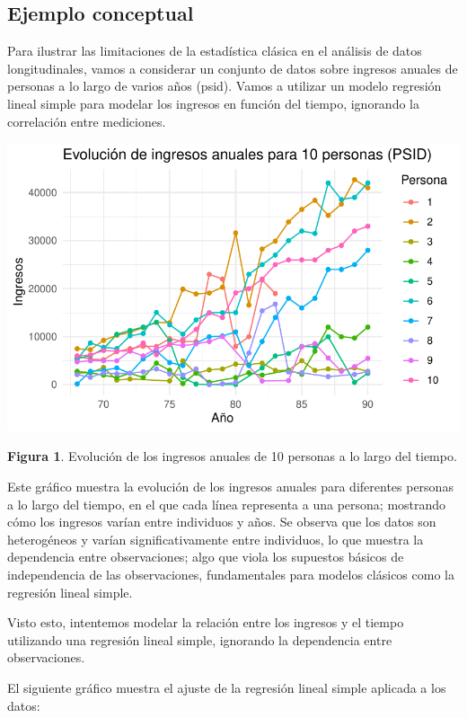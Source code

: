 \documentclass[
  letterpaper,
  DIV=11,
  numbers=noendperiod]{scrreprt}
\begin{document}
\subsection{Ejemplo conceptual}\label{ejemplo-conceptual}

Para ilustrar las limitaciones de la estadística clásica en el análisis
de datos longitudinales, vamos a considerar un conjunto de datos sobre
ingresos anuales de personas a lo largo de varios años (psid). Vamos a
utilizar un modelo regresión lineal simple para modelar los ingresos en
función del tiempo, ignorando la correlación entre mediciones.

\includegraphics{cap2_files/figure-pdf/unnamed-chunk-1-1.pdf}

\textbf{Figura 1}. Evolución de los ingresos anuales de 10 personas a lo
largo del tiempo.

Este gráfico muestra la evolución de los ingresos anuales para
diferentes personas a lo largo del tiempo, en el que cada línea
representa a una persona; mostrando cómo los ingresos varían entre
individuos y años. Se observa que los datos son heterogéneos y varían
significativamente entre individuos, lo que muestra la dependencia entre
observaciones; algo que viola los supuestos básicos de independencia de
las observaciones, fundamentales para modelos clásicos como la regresión
lineal simple.

Visto esto, intentemos modelar la relación entre los ingresos y el
tiempo utilizando una regresión lineal simple, ignorando la dependencia
entre observaciones.

El siguiente gráfico muestra el ajuste de la regresión lineal simple
aplicada a los datos:
\end{document}
